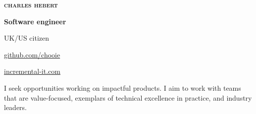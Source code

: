 \begin{center}
  \begin{lsstyle}
    {\Huge \scshape \bfseries charles hebert}
  \end{lsstyle}

  \vspace*{0.5em}

  \textbf{Software engineer}

  UK/US citizen
\end{center}

\begin{small}

\noindent
\begin{minipage}[t]{0.6\textwidth}
\end{minipage}
\noindent
\noindent
\begin{minipage}[t]{0.4\textwidth}
  \begin{description}
    \raggedleft
    \item[My code] \href{http://www.github.com/chooie}{github.com/chooie}
    \item[Website]
      \href{http://incremental-it.com}{incremental-it.com}
  \end{description}
\end{minipage}
\noindent

\end{small}

\vspace*{1em}
\begin{center}
  I seek opportunities working on impactful products. I aim to work with teams
  that are value-focused, exemplars of technical excellence in practice, and
  industry leaders.
\end{center}

